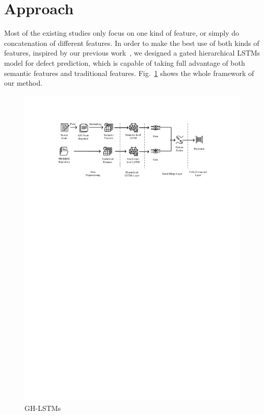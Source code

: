 \documentclass[journal]{IEEEtran}
\begin{document}
\section{Approach}
\label{approach}

Most of the existing studies only focus on one kind of feature, or simply do concatenation of different features. In order to make the best use of both kinds of features, inspired by our previous work~\cite{wang2018gated}, we designed a gated hierarchical LSTMs model for defect prediction, which is capable of taking full advantage of both semantic features and traditional features. Fig.~\ref{fig3} shows the whole framework of our method.
\begin{figure}[!h]
	\centering
	\includegraphics[scale=1.10]{figs/GH-LSTMs.pdf}
	\caption{GH-LSTMs}
	\label{fig3}
\end{figure}
\end{document}
